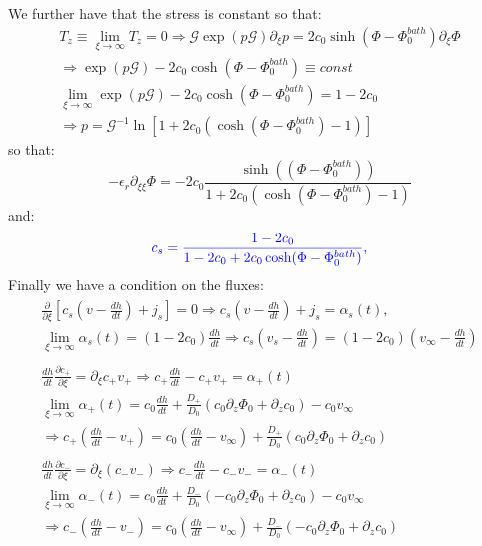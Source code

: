 \documentclass[12pt]{extarticle}
\begin{document}
We further have that the stress is constant so that:
\begin{equation}
\begin{aligned}
T_z \equiv\lim_{\xi\rightarrow\infty}T_z=0 \Rightarrow \mathcal{G}\exp(p\mathcal{G})\partial_\xi p= 2c_0\sinh(\Phi-\Phi_0^{bath})\partial_\xi \Phi\\
\Rightarrow \exp(p\mathcal{G})-2c_0\cosh(\Phi-\Phi_0^{bath})\equiv const\\
\lim_{\xi\rightarrow\infty}\exp(p\mathcal{G})-2c_0\cosh(\Phi-\Phi_0^{bath}) =1-2c_0\\
 \Rightarrow p = \mathcal{G}^{-1}\ln\left[1+2c_0\left(\cosh(\Phi-\Phi_0^{bath})-1\right)\right] 
\end{aligned}
\end{equation}
so that:
\begin{equation}
-\epsilon_r\partial_{\xi\xi} \Phi =-2c_0 \frac{\sinh((\Phi-\Phi_0^{bath}))}{1+2c_0\left(\cosh(\Phi-\Phi_0^{bath})-1\right)}
\end{equation}
and:
\begin{equation}
\color{blue}c_s = \frac{1-2c_0}{1-2c_0+2c_0\cosh(\Phi-\Phi^{bath}_0)},
\end{equation}
Finally we have a condition on the fluxes:
\begin{eqnarray}
\begin{aligned}
\frac{\partial }{\partial \xi} \left[c_s(v -\frac{dh}{dt})+j_s\right]=  0 \Rightarrow c_s\left(v -\frac{dh}{dt}\right) +j_s=\alpha_s(t),\\
\lim_{\xi\rightarrow\infty} \alpha_s(t) = (1-2c_0)\frac{dh}{dt} \Rightarrow  c_s \left(v_s-\frac{dh}{dt}\right)=(1-2c_0)\left(v_\infty-\frac{dh}{dt}\right)
\end{aligned}\\[4mm]
\begin{aligned}
\frac{dh}{dt}\frac{\partial c_+}{\partial \xi}= \partial_\xi c_+v_+\Rightarrow c_+ \frac{dh}{dt}-c_+v_+=\alpha_{+}(t)\\
\lim_{\xi\rightarrow\infty} \alpha_+(t) = c_0 \frac{dh}{dt}  +\frac{D_+}{D_0}\left(c_0 \partial_z \Phi_0+\partial_z c_0\right) -c_0 v_\infty\\
\Rightarrow  c_+ \left(\frac{dh}{dt}-v_+\right)=c_0 \left(\frac{dh}{dt}-v_\infty\right) +\frac{D_+}{D_0}\left(c_0 \partial_z \Phi_0+\partial_z c_0\right)
\end{aligned}\\[4mm]
\begin{aligned}
\frac{dh}{dt}\frac{\partial c_-}{\partial \xi}= \partial_\xi (c_-v_-)\Rightarrow c_- \frac{dh}{dt}-c_-v_-=\alpha_{-}(t)\\
\lim_{\xi\rightarrow\infty} \alpha_-(t) = c_0 \frac{dh}{dt}  +\frac{D_-}{D_0}\left(-c_0 \partial_z \Phi_0+\partial_z c_0\right)-c_0v_\infty \\
\Rightarrow  c_- \left(\frac{dh}{dt} -v_-\right)=c_0 \left(\frac{dh}{dt} -v_\infty\right) +\frac{D_-}{D_0}\left(-c_0 \partial_z \Phi_0+\partial_z c_0\right)
\end{aligned}\\
\end{eqnarray}
\end{document}

